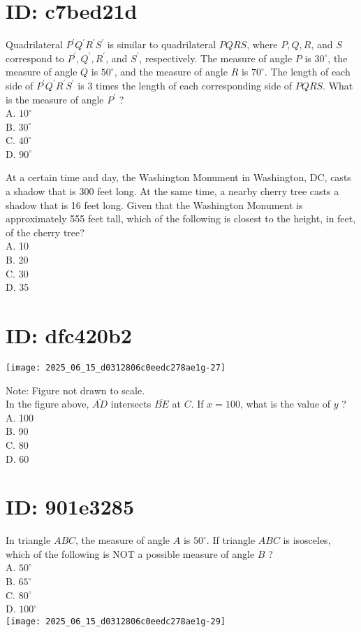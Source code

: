 \section*{ID: c7bed21d}
Quadrilateral $P^{\prime} Q^{\prime} R^{\prime} S^{\prime}$ is similar to quadrilateral $P Q R S$, where $P, Q, R$, and $S$ correspond to $P^{\prime}, Q^{\prime}, R^{\prime}$, and $S^{\prime}$, respectively. The measure of angle $P$ is $30^{\circ}$, the measure of angle $Q$ is $50^{\circ}$, and the measure of angle $R$ is $70^{\circ}$. The length of each side of $P^{\prime} Q^{\prime} R^{\prime} S^{\prime}$ is 3 times the length of each corresponding side of $P Q R S$. What is the measure of angle $P^{\prime}$ ?\\
A. $10^{\circ}$\\
B. $30^{\circ}$\\
C. $40^{\circ}$\\
D. $90^{\circ}$

At a certain time and day, the Washington Monument in Washington, DC, casts a shadow that is 300 feet long. At the same time, a nearby cherry tree casts a shadow that is 16 feet long. Given that the Washington Monument is approximately 555 feet tall, which of the following is closest to the height, in feet, of the cherry tree?\\
A. 10\\
B. 20\\
C. 30\\
D. 35

\section*{ID: dfc420b2}
\begin{center}
\texttt{[image: 2025\_06\_15\_d0312806c0eedc278ae1g-27]}
\end{center}

Note: Figure not drawn to scale.\\
In the figure above, $\overline{A D}$ intersects $\overline{B E}$ at $C$. If $x=100$, what is the value of $y$ ?\\
A. 100\\
B. 90\\
C. 80\\
D. 60

\section*{ID: 901e3285}
In triangle $A B C$, the measure of angle $A$ is $50^{\circ}$. If triangle $A B C$ is isosceles, which of the following is NOT a possible measure of angle $B$ ?\\
A. $50^{\circ}$\\
B. $65^{\circ}$\\
C. $80^{\circ}$\\
D. $100^{\circ}$\\
\texttt{[image: 2025\_06\_15\_d0312806c0eedc278ae1g-29]}


